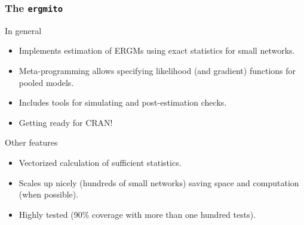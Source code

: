 \documentclass[aspectratio=169, 9pt]{beamer}\usepackage[]{graphicx}\usepackage[]{color}
\newcommand{\ergmitopkg}[0]{\texttt{ergmito}}
\begin{document}
\begin{frame}[label=ergmitopkg]
\frametitle{The \ergmitopkg{}}

In general

\begin{itemize}
\item Implements estimation of ERGMs using exact statistics for small networks.
\item Meta-programming allows specifying likelihood (and gradient) functions for
pooled models.%
\item Includes tools for simulating and post-estimation checks.
\item Getting ready for CRAN!
\end{itemize}\pause

Other features

\begin{itemize}
\item Vectorized calculation of sufficient statistics.
\item Scales up nicely (hundreds of small networks) saving space and computation (when possible).
\item Highly tested (90\% coverage with more than one hundred tests).
\end{itemize}


\end{frame}
\end{document}
